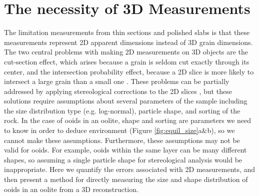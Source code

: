 \documentclass[draft]{agujournal2019}
\begin{document}
\section{The necessity of 3D Measurements}

The limitation measurements from thin sections and polished slabs is that these measurements represent 2D apparent dimensions instead of 3D grain dimensions. The two central problems with making 2D measurements on 3D objects are the cut-section effect, which arises because a grain is seldom cut exactly through its center, and the intersection probability effect, because a 2D slice is more likely to intersect a large grain than a small one \cite{higgins2000measurement}. These problems can be partially addressed by applying stereological corrections to the 2D slices \cite{peterson1996refined,sahagian19983d,higgins2000measurement}, but these solutions require assumptions about several parameters of the sample including the size distribution type (e.g. log-normal), particle shape, and sorting of the rock. In the case of ooids in an oolite, shape and sorting are parameters we need to know in order to deduce environment (Figure \ref{fig:equil_size}a\&b), so we cannot make these assumptions. Furthermore, these assumptions may not be valid for ooids. For example, ooids within the same layer can be many different shapes, so assuming a single particle shape for stereological analysis would be inappropriate. Here we quantify the errors associated with 2D measurements, and then present a method for directly measuring the size and shape distribution of ooids in an oolite from a 3D reconstruction.
\end{document}

